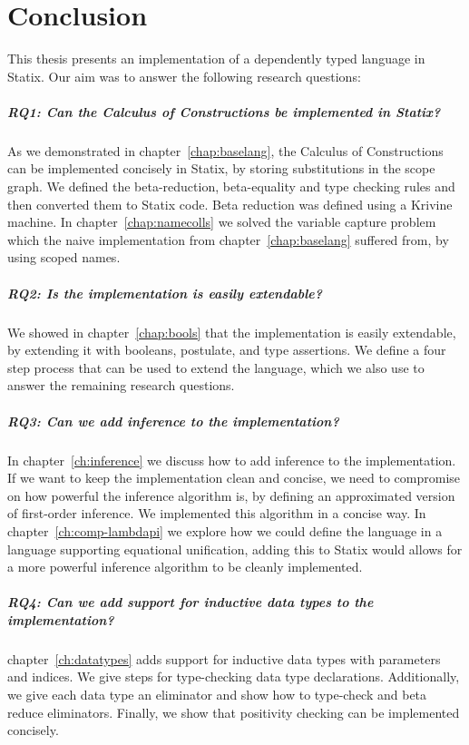 \chapter{Conclusion}
\label{ch:conclusion}

This thesis presents an implementation of a dependently typed language in Statix. Our aim was to answer the following research questions:

\paragraph{RQ1: Can the Calculus of Constructions be implemented in Statix?}
As we demonstrated in chapter~\ref{chap:baselang}, the Calculus of Constructions can be implemented concisely in Statix, by storing substitutions in the scope graph. We defined the beta-reduction, beta-equality and type checking rules and then converted them to Statix code. Beta reduction was defined using a Krivine machine. In chapter~\ref{chap:namecolls} we solved the variable capture problem which the naive implementation from chapter~\ref{chap:baselang} suffered from, by using scoped names.

\paragraph{RQ2: Is the implementation is easily extendable?}
We showed in chapter~\ref{chap:bools} that the implementation is easily extendable, by extending it with booleans, postulate, and type assertions. We define a four step process that can be used to extend the language, which we also use to answer the remaining research questions.

\paragraph{RQ3: Can we add inference to the implementation?}
In chapter~\ref{ch:inference} we discuss how to add inference to the implementation. If we want to keep the implementation clean and concise, we need to compromise on how powerful the inference algorithm is, by defining an approximated version of first-order inference. We implemented this algorithm in a concise way. In chapter~\ref{ch:comp-lambdapi} we explore how we could define the language in a language supporting equational unification, adding this to Statix would allows for a more powerful inference algorithm to be cleanly implemented.

\paragraph{RQ4: Can we add support for inductive data types to the implementation?}
chapter~\ref{ch:datatypes} adds support for inductive data types with parameters and indices. We give steps for type-checking data type declarations. Additionally, we give each data type an eliminator and show how to type-check and beta reduce eliminators. Finally, we show that positivity checking can be implemented concisely.


